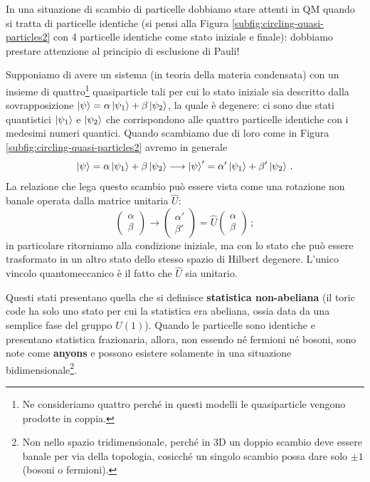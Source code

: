 \noindent In una situazione di scambio di particelle dobbiamo stare attenti in QM quando si tratta di particelle identiche (si pensi alla Figura \ref{subfig:circling-quasi-particles2} con 4 particelle identiche come stato iniziale e finale): dobbiamo prestare attenzione al principio di esclusione di Pauli! 

\noindent Supponiamo di avere un sistema (in teoria della materia condensata) con un insieme di quattro\footnote{Ne consideriamo quattro perché in questi modelli le quasiparticle vengono prodotte in coppia.} quasiparticle tali per cui lo stato iniziale sia descritto dalla sovrapposizione $\ket \psi = \alpha \ket{\psi_1} + \beta \ket{\psi_2}$, la quale è degenere: ci sono due stati quantistici $\ket{\psi_1}$ e $\ket{\psi_2}$ che corrispondono alle quattro particelle identiche con i medesimi numeri quantici. Quando scambiamo due di loro come in Figura \ref{subfig:circling-quasi-particles2} avremo in generale
\begin{equation*}
    \ket \psi = \alpha \ket{\psi_1} + \beta \ket{\psi_2} \longrightarrow \ket \psi' = \alpha' \ket{\psi_1} + \beta' \ket{\psi_2} \, .
\end{equation*}
La relazione che lega questo scambio può essere vista come una rotazione non banale operata dalla matrice unitaria $\hat{U}$:
\begin{equation*}
    \begin{pmatrix}
        \alpha \\
        \beta
    \end{pmatrix}
    \longrightarrow
    \begin{pmatrix}
        \alpha' \\
        \beta'
    \end{pmatrix}
    =\hat U
    \begin{pmatrix}
        \alpha \\
        \beta
    \end{pmatrix} \, ;
\end{equation*}
in particolare ritorniamo alla condizione iniziale, ma con lo stato che può essere trasformato in un altro stato dello stesso spazio di Hilbert degenere. L'unico vincolo quantomeccanico è il fatto che $\hat U$ sia unitario. 

\noindent Questi stati presentano quella che si definisce \textbf{statistica non-abeliana} (il toric code ha solo uno stato per cui la statistica era abeliana, ossia data da una semplice fase del gruppo $U(1)$). Quando le particelle sono identiche e presentano statistica frazionaria, allora, non essendo né fermioni né bosoni, sono note come \textbf{anyons} e possono esistere solamente in una situazione bidimensionale\footnote{Non nello spazio tridimensionale, perché in 3D un doppio scambio deve essere banale per via della topologia, cosicché un singolo scambio possa dare solo $\pm1$ (bosoni o fermioni).}. 


